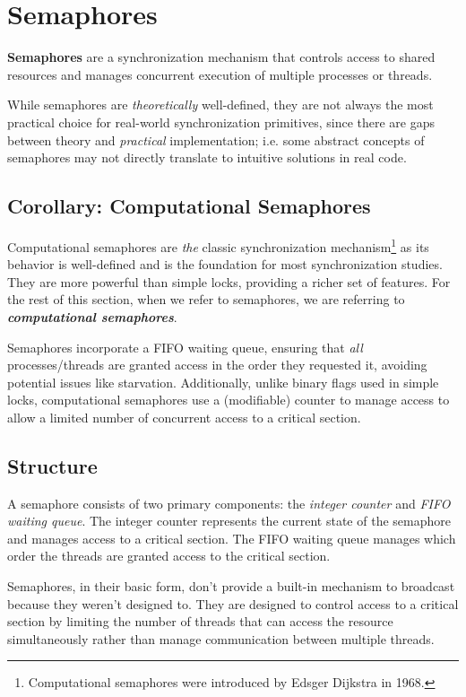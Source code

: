 \documentclass{report}
\newcommand{\definitionBegin}[1]{\begin{tcolorbox}[title={Definition: #1}]}
\newcommand{\definitionEnd}{\end{tcolorbox}}
\newcommand{\exampleBegin}[1]{\begin{tcolorbox}[colback=blue!5!white,colframe=black!75!blue,title={Example:
      #1}]}
\newcommand{\exampleEnd}{\end{tcolorbox}}
\newcommand{\asideBegin}[1]{\begin{tcolorbox}[colback=orange!5!white,colframe=black!75!orange,title={Aside:
      #1}]}
\newcommand{\asideEnd}{\end{tcolorbox}}
\begin{document}
\section{Semaphores}
\definitionBegin{Semaphores}
\textbf{Semaphores} are a synchronization mechanism that controls access to shared resources and
manages concurrent execution of multiple processes or threads.
\definitionEnd

While semaphores are \textit{theoretically} well-defined, they are not always the most practical
choice for real-world synchronization primitives, since there are gaps between theory and
\textit{practical} implementation; i.e. some abstract concepts of semaphores may not directly
translate to intuitive solutions in real code. 


\subsection*{Corollary: Computational Semaphores}
Computational semaphores are \textit{the} classic synchronization mechanism\footnote{Computational
  semaphores were introduced by Edsger Dijkstra in 1968.} as its behavior is well-defined and is
the foundation for most synchronization studies. They are more powerful than simple locks, providing
a richer set of features. For the rest of this section, when we refer to semaphores, we are
referring to \textit{\textbf{computational semaphores}}.

\exampleBegin{Waiting in Line}
Semaphores incorporate a FIFO waiting queue, ensuring that \textit{all} processes/threads are
granted access in the order they requested it, avoiding potential issues like
starvation. Additionally, unlike binary flags used in simple locks, computational semaphores use a
(modifiable) counter to manage access to allow a limited number of concurrent access to a critical section. 
\exampleEnd


\subsection{Structure}
A semaphore consists of two primary components: the \textit{integer counter} and \textit{FIFO
  waiting queue}. The integer counter represents the current state of the semaphore and manages
access to a critical section. The FIFO waiting queue manages which order the
threads are granted access to the critical section.


\asideBegin{Why Semaphores Don't Broadcast}
Semaphores, in their basic form, don't provide a built-in mechanism to broadcast because they
weren't designed to. They are designed to control access to a critical section by limiting the
number of threads that can access the resource simultaneously rather than manage communication
between multiple threads.  
\asideEnd
\end{document}
